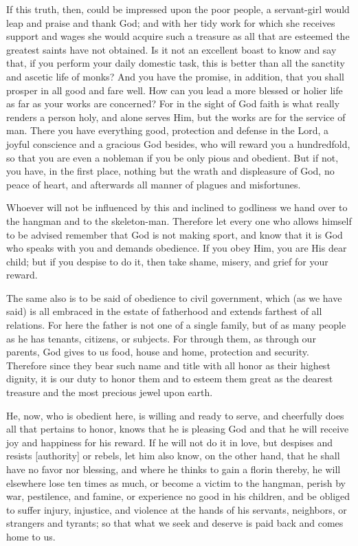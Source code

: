 If this truth, then, could be impressed upon the poor people, a
servant-girl would leap and praise and thank God; and with her tidy
work for which she receives support and wages she would acquire such a
treasure as all that are esteemed the greatest saints have not
obtained. Is it not an excellent boast to know and say that, if you
perform your daily domestic task, this is better than all the sanctity
and ascetic life of monks? And you have the promise, in addition, that
you shall prosper in all good and fare well. How can you lead a more
blessed or holier life as far as your works are concerned? For in the
sight of God faith is what really renders a person holy, and alone
serves Him, but the works are for the service of man. There you have
everything good, protection and defense in the Lord, a joyful
conscience and a gracious God besides, who will reward you a
hundredfold, so that you are even a nobleman if you be only pious and
obedient. But if not, you have, in the first place, nothing but the
wrath and displeasure of God, no peace of heart, and afterwards all
manner of plagues and misfortunes.

Whoever will not be influenced by this and inclined to godliness we
hand over to the hangman and to the skeleton-man. Therefore let every
one who allows himself to be advised remember that God is not making
sport, and know that it is God who speaks with you and demands
obedience. If you obey Him, you are His dear child; but if you despise
to do it, then take shame, misery, and grief for your reward.

The same also is to be said of obedience to civil government, which (as
we have said) is all embraced in the estate of fatherhood and extends
farthest of all relations. For here the father is not one of a single
family, but of as many people as he has tenants, citizens, or subjects.
For through them, as through our parents, God gives to us food, house
and home, protection and security. Therefore since they bear such name
and title with all honor as their highest dignity, it is our duty to
honor them and to esteem them great as the dearest treasure and the
most precious jewel upon earth.

He, now, who is obedient here, is willing and ready to serve, and
cheerfully does all that pertains to honor, knows that he is pleasing
God and that he will receive joy and happiness for his reward. If he
will not do it in love, but despises and resists [authority] or rebels,
let him also know, on the other hand, that he shall have no favor nor
blessing, and where he thinks to gain a florin thereby, he will
elsewhere lose ten times as much, or become a victim to the hangman,
perish by war, pestilence, and famine, or experience no good in his
children, and be obliged to suffer injury, injustice, and violence at
the hands of his servants, neighbors, or strangers and tyrants; so that
what we seek and deserve is paid back and comes home to us.

